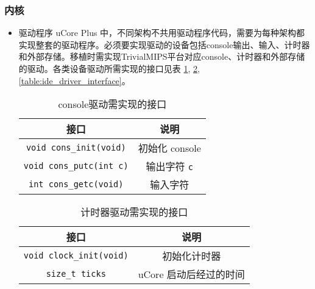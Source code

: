\subsubsection{内核}
\begin{itemize}
\item{驱动程序}
uCore Plus 中，不同架构不共用驱动程序代码，需要为每种架构都实现整套的驱动程序。必须要实现驱动的设备包括console输出、输入、计时器和外部存储。移植时需实现TrivialMIPS平台对应console、计时器和外部存储的驱动。各类设备驱动所需实现的接口见表 \ref{table:console_driver_interface}, \ref{table:timer_driver_interface}, \ref{table:ide_driver_interface}。

\begin{table}[!htbp]
\centering
\begin{tabular}{|c|c|}
\hline
\textbf{接口}                                      & \textbf{说明}                      \\ \hline
\texttt{void cons\_init(void)}  & 初始化 console                      \\ \hline
\texttt{void cons\_putc(int c)} & 输出字符 \texttt{c} \\ \hline
\texttt{int cons\_getc(void)}   & 输入字符                             \\ \hline
\end{tabular}
    \caption{console驱动需实现的接口}
    \label{table:console_driver_interface}
\end{table}


\begin{table}[!htbp]
\centering
\begin{tabular}{|c|c|}
\hline
\textbf{接口}                                      & \textbf{说明}                      \\ \hline
\texttt{void clock\_init(void)}  & 初始化计时器                      \\ \hline
\texttt{size\_t ticks}   & uCore 启动后经过的时间                             \\ \hline
\end{tabular}
    \caption{计时器驱动需实现的接口}
    \label{table:timer_driver_interface}
\end{table}


\end{itemize}
